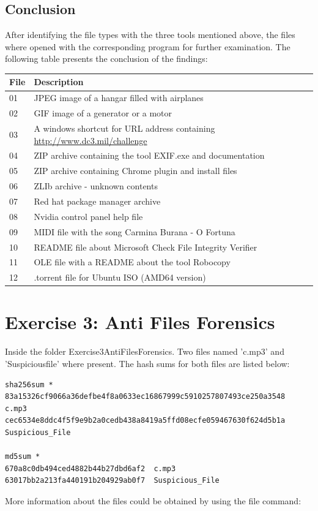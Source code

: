 \documentclass[a4paper,10pt,oneside]{article}
\begin{document}
\subsection{Conclusion}
After identifying the file types with the three tools mentioned above, the files where opened with the corresponding program for further examination.
The following table presents the conclusion of the findings:
\begin{center}
        \begin{tabular}{|l|p{10cm}|}
                \hline
                \textbf{File} & \textbf{Description} \\ \hline
                01 & JPEG image of a hangar filled with airplanes \\ \hline
                02 & GIF image of a generator or a motor\\ \hline
                03 & A windows shortcut for URL address containing \url{http://www.dc3.mil/challenge} \\ \hline
                04 & ZIP archive containing the tool EXIF.exe and documentation \\ \hline
                05 & ZIP archive containing Chrome plugin and install files \\ \hline
                06 & ZLIb archive - unknown contents \\ \hline
                07 & Red hat package manager archive \\ \hline
                08 & Nvidia control panel help file \\ \hline
                09 & MIDI file with the song Carmina Burana - O Fortuna \\ \hline
                10 & README file about Microsoft Check File Integrity Verifier \\ \hline
                11 & OLE file with a README about the tool Robocopy \\ \hline
                12 & .torrent file for Ubuntu ISO (AMD64 version) \\ \hline
        \end{tabular}
\end{center}
\newpage
\section{Exercise 3: Anti Files Forensics}
Inside the folder Exercise3\textunderscore Anti\textunderscore Files\textunderscore Forensics. Two files named 'c.mp3' and 'Suspicious\textunderscore file' where present. The hash sums for both files are listed below:
\begin{lstlisting}[caption=SHA256 and MD5 sum of files in folder]
sha256sum *
83a15326cf9066a36defbe4f8a0633ec16867999c5910257807493ce250a3548  c.mp3
cec6534e8ddc4f5f9e9b2a0cedb438a8419a5ffd08ecfe059467630f624d5b1a  Suspicious_File

md5sum *
670a8c0db494ced4882b44b27dbd6af2  c.mp3
63017bb2a213fa440191b204929ab0f7  Suspicious_File
\end{lstlisting}
More information about the files could be obtained by using the file command:
\end{document}
